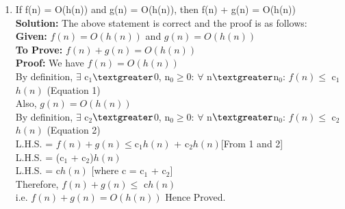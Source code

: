 \documentclass[12pt]{article}
\begin{document}
\begin{enumerate}
\begin{enumerate}
\begin{enumerate}
\item { If f(n) = O(h(n)) and g(n) = O(h(n)), then f(n) + g(n) = O(h(n))}\\
\textbf{Solution:} The above statement is correct and the proof is as follows:\\            
\textbf{Given:}  $f(n) = O(h(n))$ and $g(n) = O(h(n))$\\       
\textbf{To Prove:} $f(n) + g(n) = O(h(n))$\\
\textbf{Proof:} We have $f(n) = O(h(n))$ \\
By definition, $\exists$ c$_{1}$$\textgreater$0, n$_{0}\ge$0: $\forall$ n$\textgreater$n$_{0}$: $f(n) \le$ c$_{1}$$h(n)$ \hfill (Equation 1)\\  
Also, $g(n) = O(h(n))$ \\
By definition, $\exists$ c$_{2}$$\textgreater$0, n$_{0}\ge$0: $\forall$ n$\textgreater$n$_{0}$: $f(n) \le$ c$_{2}$$h(n)$ \hfill (Equation 2)\\ 
L.H.S. = $ f(n) + g(n) \le $c$_{1}h(n)$ + c$_{2}h(n) $\hfill [From 1 and 2]\\
L.H.S. = (c$_{1}$ + c$_{2}$)$h(n)$\\
L.H.S. = c$h(n)$ \hfill [where c = c$_{1}$ + c$_{2}$]\\
Therefore, $f(n) + g(n) \le $ c$h(n)$ \\
i.e. $f(n) + g(n) = O(h(n))$ Hence Proved.\\



\end{enumerate}
\end{enumerate}
\end{enumerate}
\end{document}
